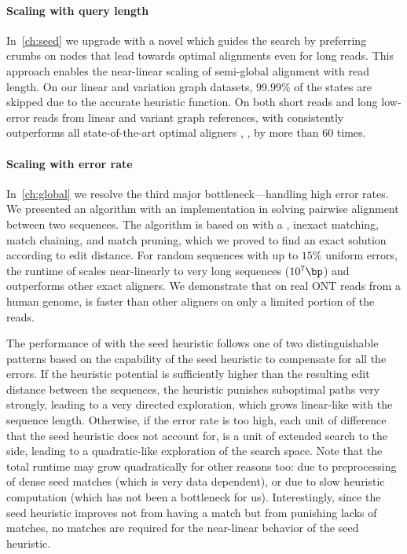 \paragraph{Scaling with query length}
In~\cref{ch:seed} we upgrade \astarix with a novel \sh which guides the \A
search by preferring crumbs on nodes that lead towards optimal alignments even
for long reads. This approach enables the near-linear scaling of semi-global
alignment with read length. On our linear and variation graph datasets, 99.99\%
of the states are skipped due to the accurate heuristic function. On both short
reads and long low-error reads from linear and variant graph references, \A with
\sh consistently outperforms all state-of-the-art optimal aligners
\graphaligner, \vargas, \pasgal by more than 60 times.

\paragraph{Scaling with error rate}
In~\cref{ch:global} we resolve the third major bottleneck---handling high error
rates. We presented an algorithm with an implementation in \astarpa solving
pairwise alignment between two sequences. The algorithm is based on \A with a
\sh, inexact matching, match chaining, and match pruning, which we proved to
find an exact solution according to edit distance. For random sequences with up
to $15\%$ uniform errors, the runtime of \astarpa scales near-linearly to very
long sequences ($10^7\bp$) and outperforms other exact aligners. We demonstrate
that on real ONT reads from a human genome, \astarpa is faster than other
aligners on only a limited portion of the reads.

The performance of \A with the seed heuristic follows one of two distinguishable
patterns based on the capability of the seed heuristic to compensate for all the
errors. If the heuristic potential is sufficiently higher than the resulting
edit distance between the sequences, the heuristic punishes suboptimal paths
very strongly, leading to a very directed \A exploration, which grows
linear-like with the sequence length. Otherwise, if the error rate is too high,
each unit of difference that the seed heuristic does not account for, is a unit
of extended search to the side, leading to a quadratic-like exploration of the
search space. Note that the total runtime may grow quadratically for other
reasons too: due to preprocessing of dense seed matches (which is very data
dependent), or due to slow heuristic computation (which has not been a
bottleneck for us). Interestingly, since the seed heuristic improves not from
having a match but from punishing lacks of matches, no matches are required for
the near-linear behavior of the seed heuristic.

